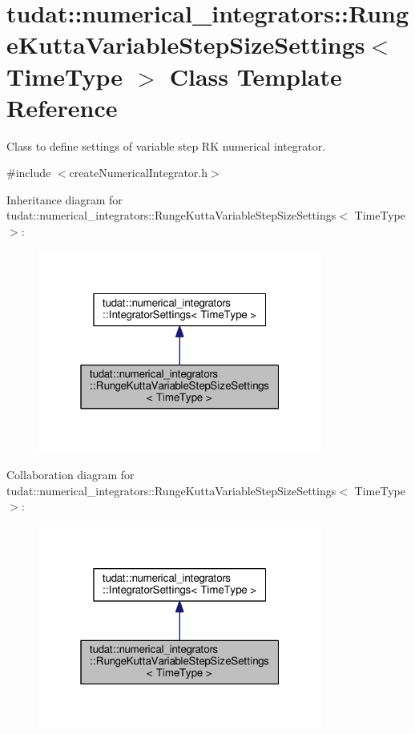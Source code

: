 \hypertarget{classtudat_1_1numerical__integrators_1_1RungeKuttaVariableStepSizeSettings}{}\section{tudat\+:\+:numerical\+\_\+integrators\+:\+:Runge\+Kutta\+Variable\+Step\+Size\+Settings$<$ Time\+Type $>$ Class Template Reference}
\label{classtudat_1_1numerical__integrators_1_1RungeKuttaVariableStepSizeSettings}


Class to define settings of variable step RK numerical integrator.  




{\ttfamily \#include $<$create\+Numerical\+Integrator.\+h$>$}



Inheritance diagram for tudat\+:\+:numerical\+\_\+integrators\+:\+:Runge\+Kutta\+Variable\+Step\+Size\+Settings$<$ Time\+Type $>$\+:
\nopagebreak
\begin{figure}[H]
\begin{center}
\leavevmode
\includegraphics[width=265pt]{classtudat_1_1numerical__integrators_1_1RungeKuttaVariableStepSizeSettings__inherit__graph}
\end{center}
\end{figure}


Collaboration diagram for tudat\+:\+:numerical\+\_\+integrators\+:\+:Runge\+Kutta\+Variable\+Step\+Size\+Settings$<$ Time\+Type $>$\+:
\nopagebreak
\begin{figure}[H]
\begin{center}
\leavevmode
\includegraphics[width=265pt]{classtudat_1_1numerical__integrators_1_1RungeKuttaVariableStepSizeSettings__coll__graph}
\end{center}
\end{figure}
